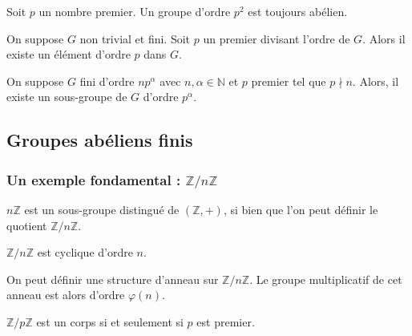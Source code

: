   \begin{corollary}
    Soit $p$ un nombre premier. Un groupe d'ordre $p^2$ est toujours abélien.
  \end{corollary}

  \begin{application}
    On suppose $G$ non trivial et fini. Soit $p$ un premier divisant l'ordre de $G$. Alors il existe un élément d'ordre $p$ dans $G$.
  \end{application}


  \begin{application}
    On suppose $G$ fini d'ordre $n p^\alpha$ avec $n, \alpha \in \mathbb{N}$ et $p$ premier tel que $p \nmid n$. Alors, il existe un sous-groupe de $G$ d’ordre $p^\alpha$.
  \end{application}

  \subsection{Groupes abéliens finis}

  \subsubsection{Un exemple fondamental : \texorpdfstring{$\mathbb{Z}/n\mathbb{Z}$}{Z/nZ}}


  \begin{proposition}
    $n\mathbb{Z}$ est un sous-groupe distingué de $(\mathbb{Z}, +)$, si bien que l'on peut définir le quotient $\mathbb{Z}/n\mathbb{Z}$.
  \end{proposition}

  \begin{proposition}
    $\mathbb{Z}/n\mathbb{Z}$ est cyclique d'ordre $n$.
  \end{proposition}

  \begin{proposition}
    On peut définir une structure d'anneau sur $\mathbb{Z}/n\mathbb{Z}$. Le groupe multiplicatif de cet anneau est alors d'ordre $\varphi(n)$.
  \end{proposition}

  \begin{corollary}
    $\mathbb{Z}/p\mathbb{Z}$ est un corps si et seulement si $p$ est premier.
  \end{corollary}

